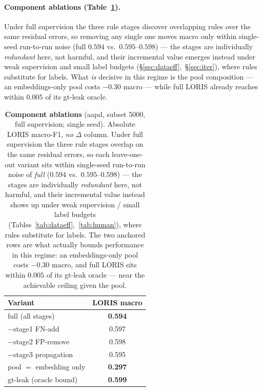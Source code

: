 \documentclass[11pt]{article}
\newcommand{\bld}[1]{\textbf{#1}}\newcommand{\gn}[1]{\textcolor{blue}{#1}}
\begin{document}
\paragraph{Component ablations (Table~\ref{tab:abl}).} Under full supervision the three rule
stages discover overlapping rules over the same residual errors, so removing any single one moves macro
only within single-seed run-to-run noise (full $0.594$ vs.\ $0.595$--$0.598$) --- the stages are
individually \emph{redundant} here, not harmful, and their incremental value emerges instead under weak
supervision and small label budgets (\S\ref{sec:dataeff},~\S\ref{sec:iter}), where rules substitute for
labels. What \emph{is} decisive in this regime is the pool composition --- an embeddings-only pool costs
$-0.30$ macro --- while full LORIS already reaches within $0.005$ of its gt-leak oracle.
\begin{table}[h]\centering
\caption{\textbf{Component ablations} (aapd, subset 5000, full supervision; single seed). Absolute LORIS
macro-F1, \emph{no} $\Delta$ column. Under full supervision the three rule stages overlap on the same
residual errors, so each leave-one-out variant sits within single-seed run-to-run noise of \emph{full}
($0.594$ vs.\ $0.595$--$0.598$) --- the stages are individually \emph{redundant} here, not harmful, and
their incremental value instead shows up under weak supervision / small label budgets
(Tables~\ref{tab:dataeff},~\ref{tab:human}), where rules substitute for labels. The two
\colorbox{blue!8}{anchored} rows are what actually bounds performance in this regime: an embeddings-only
pool costs $-0.30$ macro, and full LORIS sits within $0.005$ of its gt-leak oracle --- near the achievable
ceiling given the pool.}
\label{tab:abl}\small
\begin{tabular}{lc}
\toprule
Variant & LORIS macro \\
\midrule
full (all stages) & \bld{0.594} \\
\quad $-$stage1 FN-add & 0.597 \\
\quad $-$stage2 FP-remove & 0.598 \\
\quad $-$stage3 propagation & 0.595 \\
\midrule
\rowcolor{blue!8} pool $=$ embedding only & \bld{0.297} \\
\rowcolor{blue!8} gt-leak (oracle bound) & \bld{0.599} \\
\bottomrule
\end{tabular}
\end{table}
\end{document}
